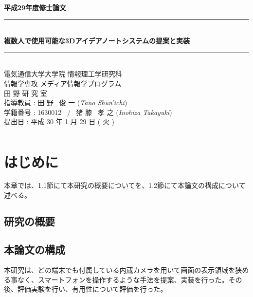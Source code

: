 \documentclass[11pt,a4j, titlepage]{jarticle} %
\begin{document}
\begin{titlepage}
	\begin{center}
		\vspace{8ex}
		{\Large \bf 平成29年度修士論文}
		\vspace{3ex}\\
		\rule{\hsize}{2mm}
		\vspace{1mm}\\ 
		{\LARGE \bf 複数人で使用可能な3Dアイデアノートシステムの提案と実装} 
		\vspace{6mm}\\ 
		\rule{\hsize}{2mm} 
		\vspace{2.5cm} \\ 
		{\Large 電気通信大学大学院 情報理工学研究科 \\ 
		情報学専攻 メディア情報学プログラム} 
		\vspace{2ex} \\ 
		\renewcommand{\thefootnote}{\fnsymbol{footnote}} 
		{\Large 田 野 研 究 室} 
		\vspace{3ex} \\ 
		{\Large 指導教員 : 田 野 \ 俊 一 ({\em Tano Shun'ichi})} 
		\vspace{3ex} \\
		{\Large 学籍番号 : 1630012 \ / \ 猪 膝 \ 孝 之 ({\em Inohiza Takayuki})} 
		\vspace{5ex} \\ 
		{\Large 提出日 : 平成 30 年 1 月 29 日 ( 火 )} 
		\vspace{-5ex} \\ 
		\begin{verbatim} 
		\end{verbatim} 
	\end{center} 
\end{titlepage}

\tableofcontents
\newpage
\listoffigures
\newpage
\listoftables
\newpage
\section{はじめに}
本章では、1.1節にて本研究の概要についてを、1.2節にて本論文の構成について述べる。

\subsection{研究の概要}


\subsection{本論文の構成}
本研究は、どの端末でも付属している内蔵カメラを用いて画面の表示領域を狭める事なく、スマートフォンを操作するような手法を提案、実装を行った。その後、評価実験を行い、有用性について評価を行った。
\end{document}
